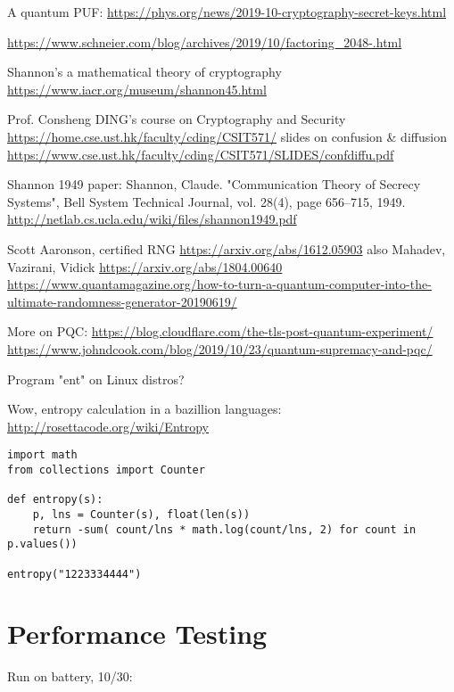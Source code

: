 \documentclass[%
 aip,
 jmp,%
 amsmath,amssymb,
 reprint,%
]{revtex4-1}
\begin{document}
A quantum PUF:
\url{https://phys.org/news/2019-10-cryptography-secret-keys.html}

\url{https://www.schneier.com/blog/archives/2019/10/factoring_2048-.html}

Shannon's a mathematical theory of cryptography
\url{https://www.iacr.org/museum/shannon45.html}

Prof. Consheng DING's course on Cryptography and Security
\url{https://home.cse.ust.hk/faculty/cding/CSIT571/}
slides on confusion \& diffusion
\url{https://www.cse.ust.hk/faculty/cding/CSIT571/SLIDES/confdiffu.pdf}

Shannon 1949 paper:
Shannon, Claude. "Communication Theory of Secrecy Systems", Bell System Technical Journal, vol. 28(4), page 656–715, 1949.
\url{http://netlab.cs.ucla.edu/wiki/files/shannon1949.pdf}

Scott Aaronson, certified RNG
\url{https://arxiv.org/abs/1612.05903}
also Mahadev, Vazirani, Vidick
\url{https://arxiv.org/abs/1804.00640}
\url{https://www.quantamagazine.org/how-to-turn-a-quantum-computer-into-the-ultimate-randomness-generator-20190619/}


More on PQC:
\url{https://blog.cloudflare.com/the-tls-post-quantum-experiment/}
\url{https://www.johndcook.com/blog/2019/10/23/quantum-supremacy-and-pqc/}

Program "ent" on Linux distros?

Wow, entropy calculation in a bazillion languages:
\url{http://rosettacode.org/wiki/Entropy}
\begin{verbatim}
import math
from collections import Counter

def entropy(s):
    p, lns = Counter(s), float(len(s))
    return -sum( count/lns * math.log(count/lns, 2) for count in p.values())

entropy("1223334444")
\end{verbatim}

\section{Performance Testing}

Run on battery, 10/30:
\end{document}
